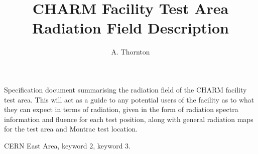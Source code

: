 \documentclass{accnote}
\begin{document}
\title{CHARM Facility Test Area Radiation Field Description}
\author{A. Thornton}
\maketitle

\begin{NoteAbstract}
Specification document summarising the radiation field of the CHARM facility test area. This will act as a guide to any potential users of the facility as to what they can expect in terms of radiation, given in the form of radiation spectra information and fluence for each test position, along with general radiation maps for the test area and Montrac test location. \\
\end{NoteAbstract}
\begin{Keywords}
CERN East Area, keyword 2, keyword 3.
\end{Keywords}

\newpage
{}
\tableofcontents

\newpage
{}






\end{document}
